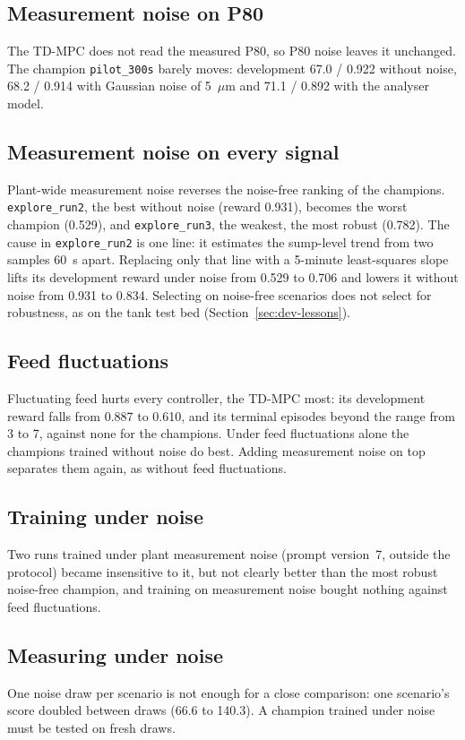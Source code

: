 \subsection{Measurement noise on P80}
The TD-MPC does not read the measured P80, so P80 noise leaves it unchanged.
The champion \texttt{pilot\_300s} barely moves: development 67.0 / 0.922
without noise, 68.2 / 0.914 with Gaussian noise of 5~$\mu$m and 71.1 / 0.892
with the analyser model.

\subsection{Measurement noise on every signal}
Plant-wide measurement noise reverses the noise-free ranking of the champions.
\texttt{explore\_run2}, the best without noise (reward 0.931), becomes the
worst champion (0.529), and \texttt{explore\_run3}, the weakest, the most
robust (0.782). The cause in \texttt{explore\_run2} is one line: it estimates
the sump-level trend from two samples 60~s apart. Replacing only that line with
a 5-minute least-squares slope lifts its development reward under noise from
0.529 to 0.706 and lowers it without noise from 0.931 to 0.834. Selecting on
noise-free scenarios does not select for robustness, as on the tank test bed
(Section~\ref{sec:dev-lessons}).

\subsection{Feed fluctuations}
Fluctuating feed hurts every controller, the TD-MPC most: its development
reward falls from 0.887 to 0.610, and its terminal episodes beyond the range
from 3 to 7, against none for the champions. Under feed fluctuations alone the
champions trained without noise do best. Adding measurement noise on top
separates them again, as without feed fluctuations.

\subsection{Training under noise}
Two runs trained under plant measurement noise (prompt version~7, outside the
protocol) became insensitive to it, but not clearly better than the most robust
noise-free champion, and training on measurement noise bought nothing against
feed fluctuations.

\subsection{Measuring under noise}
One noise draw per scenario is not enough for a close comparison: one
scenario's score doubled between draws (66.6 to 140.3). A champion trained
under noise must be tested on fresh draws.

